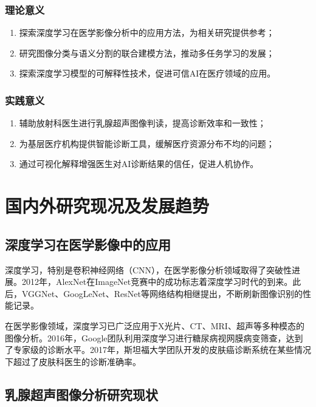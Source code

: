 \documentclass[supercite]{Hust-undergraduate-kaiti}
\theoremstyle{definition}
\begin{document}
\subsubsection{理论意义}

\begin{enumerate}
    \item 探索深度学习在医学影像分析中的应用方法，为相关研究提供参考；
    \item 研究图像分类与语义分割的联合建模方法，推动多任务学习的发展；
    \item 探索深度学习模型的可解释性技术，促进可信AI在医疗领域的应用。
\end{enumerate}

\subsubsection{实践意义}

\begin{enumerate}
    \item 辅助放射科医生进行乳腺超声图像判读，提高诊断效率和一致性；
    \item 为基层医疗机构提供智能诊断工具，缓解医疗资源分布不均的问题；
    \item 通过可视化解释增强医生对AI诊断结果的信任，促进人机协作。
\end{enumerate}

\section{国内外研究现况及发展趋势}

\subsection{深度学习在医学影像中的应用}

深度学习，特别是卷积神经网络（CNN），在医学影像分析领域取得了突破性进展。2012年，AlexNet\cite{ref1}在ImageNet竞赛中的成功标志着深度学习时代的到来。此后，VGGNet、GoogLeNet、ResNet\cite{ref2}等网络结构相继提出，不断刷新图像识别的性能记录。

在医学影像领域，深度学习已广泛应用于X光片、CT、MRI、超声等多种模态的图像分析。2016年，Google团队利用深度学习进行糖尿病视网膜病变筛查，达到了专家级的诊断水平。2017年，斯坦福大学团队开发的皮肤癌诊断系统在某些情况下超过了皮肤科医生的诊断准确率。

\subsection{乳腺超声图像分析研究现状}
\end{document}
